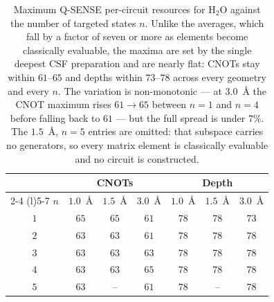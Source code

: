 \begin{table}
    \centering
    \caption{Maximum Q-SENSE per-circuit resources for H$_2$O against the number
    of targeted states $n$. Unlike the averages, which fall by a factor of
    seven or more as elements become classically evaluable, the maxima are set
    by the single deepest CSF preparation and are nearly flat: CNOTs stay within
    $61$--$65$ and depths within $73$--$78$ across every geometry and every $n$.
    The variation is non-monotonic --- at $3.0$~\AA{} the CNOT maximum rises
    $61 \to 65$ between $n=1$ and $n=4$ before falling back to $61$ --- but the
    full spread is under $7\%$. The $1.5$~\AA{}, $n=5$ entries are omitted:
    that subspace carries no generators, so every matrix element is classically
    evaluable and no circuit is constructed.}
    \label{tab:h2o-circuit-max}
    \renewcommand{\arraystretch}{1.3}
    \begin{tabular*}{\columnwidth}{@{\extracolsep{\fill}}ccccccc@{}}
    \toprule
     & \multicolumn{3}{c}{CNOTs} & \multicolumn{3}{c}{Depth} \\
    \cmidrule(lr){2-4} \cmidrule(l){5-7}
    $n$ & $1.0$~\AA{} & $1.5$~\AA{} & $3.0$~\AA{}
        & $1.0$~\AA{} & $1.5$~\AA{} & $3.0$~\AA{} \\
    \midrule
    $1$ & $65$ & $65$ & $61$ & $78$ & $78$ & $73$ \\
    $2$ & $63$ & $63$ & $61$ & $78$ & $78$ & $78$ \\
    $3$ & $63$ & $63$ & $63$ & $78$ & $78$ & $78$ \\
    $4$ & $63$ & $63$ & $65$ & $78$ & $78$ & $78$ \\
    $5$ & $63$ & -- & $61$ & $78$ & -- & $78$ \\
    \bottomrule
    \end{tabular*}
\end{table}
